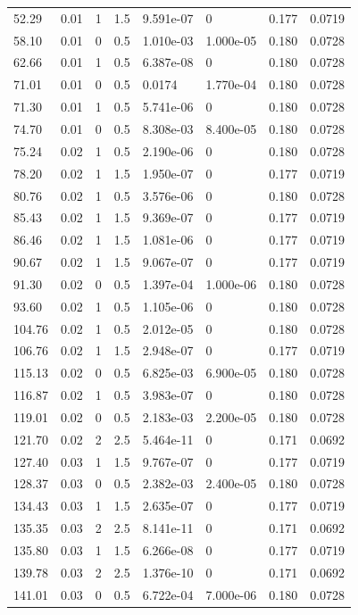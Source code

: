 \documentclass[preview]{standalone}
\begin{document}
{{\begin{tabular}{L{1.2cm}C{1.2cm} C{0.3cm}C{0.5cm} C{1.4cm}C{1.4cm} C{1.4cm}C{1.4cm}}
  52.29  &  0.01  & 1     & 1.5 &  9.591e-07  & 0  & 0.177 &  0.0719   \\ 
  58.10  &  0.01  & 0     & 0.5 &  1.010e-03  & 1.000e-05  & 0.180 &  0.0728   \\ 
  62.66  &  0.01  & 1     & 0.5 &  6.387e-08  & 0  & 0.180 &  0.0728   \\ 
  71.01  &  0.01  & 0     & 0.5 &  0.0174  & 1.770e-04  & 0.180 &  0.0728   \\ 
  71.30  &  0.01  & 1     & 0.5 &  5.741e-06  & 0  & 0.180 &  0.0728   \\ 
  74.70  &  0.01  & 0     & 0.5 &  8.308e-03  & 8.400e-05  & 0.180 &  0.0728   \\ 
  75.24  &  0.02  & 1     & 0.5 &  2.190e-06  & 0  & 0.180 &  0.0728   \\ 
  78.20  &  0.02  & 1     & 1.5 &  1.950e-07  & 0  & 0.177 &  0.0719   \\ 
  80.76  &  0.02  & 1     & 0.5 &  3.576e-06  & 0  & 0.180 &  0.0728   \\ 
  85.43  &  0.02  & 1     & 1.5 &  9.369e-07  & 0  & 0.177 &  0.0719   \\ 
  86.46  &  0.02  & 1     & 1.5 &  1.081e-06  & 0  & 0.177 &  0.0719   \\ 
  90.67  &  0.02  & 1     & 1.5 &  9.067e-07  & 0  & 0.177 &  0.0719   \\ 
  91.30  &  0.02  & 0     & 0.5 &  1.397e-04  & 1.000e-06  & 0.180 &  0.0728   \\ 
  93.60  &  0.02  & 1     & 0.5 &  1.105e-06  & 0  & 0.180 &  0.0728   \\ 
  104.76  &  0.02  & 1     & 0.5 &  2.012e-05  & 0  & 0.180 &  0.0728   \\ 
  106.76  &  0.02  & 1     & 1.5 &  2.948e-07  & 0  & 0.177 &  0.0719   \\ 
  115.13  &  0.02  & 0     & 0.5 &  6.825e-03  & 6.900e-05  & 0.180 &  0.0728   \\ 
  116.87  &  0.02  & 1     & 0.5 &  3.983e-07  & 0  & 0.180 &  0.0728   \\ 
  119.01  &  0.02  & 0     & 0.5 &  2.183e-03  & 2.200e-05  & 0.180 &  0.0728   \\ 
  121.70  &  0.02  & 2     & 2.5 &  5.464e-11  & 0  & 0.171 &  0.0692   \\ 
  127.40  &  0.03  & 1     & 1.5 &  9.767e-07  & 0  & 0.177 &  0.0719   \\ 
  128.37  &  0.03  & 0     & 0.5 &  2.382e-03  & 2.400e-05  & 0.180 &  0.0728   \\ 
  134.43  &  0.03  & 1     & 1.5 &  2.635e-07  & 0  & 0.177 &  0.0719   \\ 
  135.35  &  0.03  & 2     & 2.5 &  8.141e-11  & 0  & 0.171 &  0.0692   \\ 
  135.80  &  0.03  & 1     & 1.5 &  6.266e-08  & 0  & 0.177 &  0.0719   \\ 
  139.78  &  0.03  & 2     & 2.5 &  1.376e-10  & 0  & 0.171 &  0.0692   \\ 
  141.01  &  0.03  & 0     & 0.5 &  6.722e-04  & 7.000e-06  & 0.180 &  0.0728   \\ 
\hline 
\end{tabular} 

}}
\end{document}
